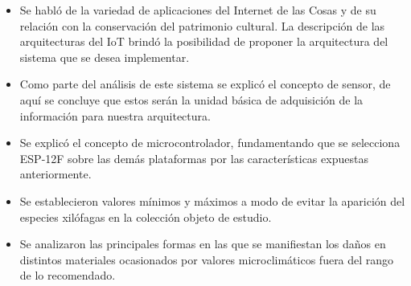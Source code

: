     \begin{itemize}
        \item Se habló de la variedad de aplicaciones del Internet de las Cosas y de su relación con la conservación del patrimonio cultural. La descripción de las arquitecturas del IoT brindó la posibilidad de proponer la arquitectura del sistema que se desea implementar.
        \item Como parte del análisis de este sistema se explicó el concepto de sensor, de aquí se concluye que estos serán la unidad básica de adquisición de la información para nuestra arquitectura.
        \item Se explicó el concepto de microcontrolador, fundamentando que se selecciona ESP-12F sobre las demás plataformas por las características expuestas anteriormente.
        \item Se establecieron valores mínimos y máximos a modo de evitar la aparición del especies xilófagas en la colección objeto de estudio.
        \item Se analizaron las principales formas en las que se manifiestan los daños en distintos materiales ocasionados por valores microclimáticos fuera del rango de lo recomendado. 
    \end{itemize}